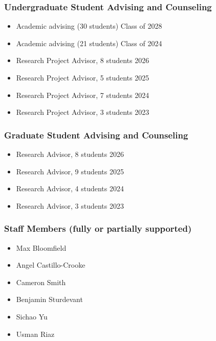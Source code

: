 \subsubsection{Undergraduate Student Advising and Counseling}
\begin{itemize}
  \item Academic advising (30 students) \hfill Class of 2028
  \item Academic advising (21 students) \hfill Class of 2024
  \item Research Project Advisor, 8 students \hfill 2026
  \item Research Project Advisor, 5 students \hfill 2025
  \item Research Project Advisor, 7 students \hfill 2024
  \item Research Project Advisor, 3 students \hfill 2023
\end{itemize}

\subsubsection{Graduate Student Advising and Counseling}
%
\begin{itemize}
  \item Research Advisor, 8 students \hfill 2026
  \item Research Advisor, 9 students \hfill 2025
  \item Research Advisor, 4 students \hfill 2024
  \item Research Advisor, 3 students \hfill 2023
\end{itemize}



\subsubsection{Staff Members (fully or partially supported)}
\begin{itemize}
\item Max Bloomfield
\item Angel Castillo-Crooke
\item Cameron Smith
\item Benjamin Sturdevant
\item Sichao Yu
\item Usman Riaz
\end{itemize}
